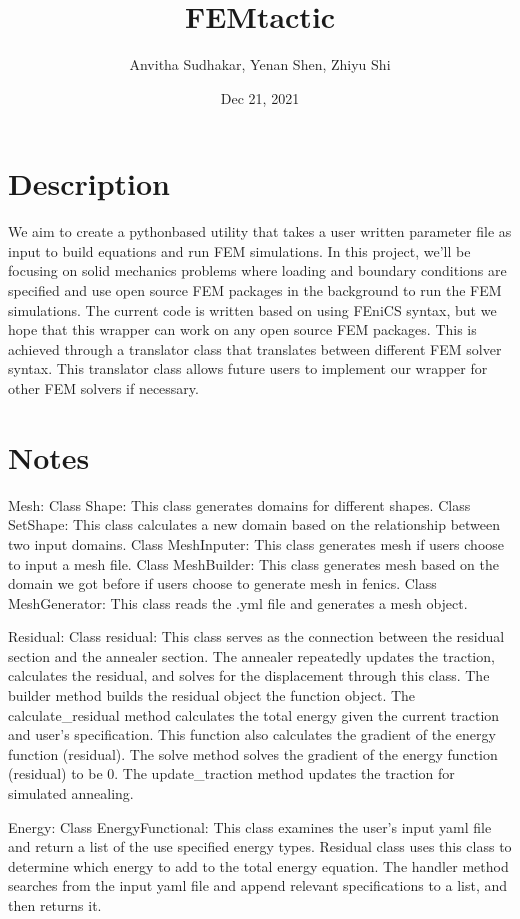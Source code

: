 \documentclass[letterpaper,10pt,english]{sphinxmanual}
\title{FEMtactic}
\date{Dec 21, 2021}
\author{Anvitha Sudhakar, Yenan Shen, Zhiyu Shi}
\begin{document}
\pagestyle{empty}
\sphinxmaketitle
\pagestyle{plain}
\sphinxtableofcontents
\pagestyle{normal}
\label{\detokenize{index::doc}}



\chapter{Description}
\label{\detokenize{index:description}}
We aim to create a python\sphinxhyphen{}based utility that takes a user written parameter file as input to build equations and run FEM simulations. In this project, we’ll be focusing on solid mechanics problems where loading and boundary conditions are specified and use open source FEM packages in the background to run the FEM simulations. The current code is written based on using FEniCS syntax, but we hope that this wrapper can work on any open source FEM packages. This is achieved through a translator class that translates between different FEM solver syntax. This translator class allows future users to implement our wrapper for other FEM solvers if necessary.


\chapter{Notes}
\label{\detokenize{index:notes}}
Mesh:
Class Shape: This class generates domains for different shapes.
Class SetShape: This class calculates a new domain based on the relationship between two input domains.
Class MeshInputer: This class generates mesh if users choose to input a mesh file.
Class MeshBuilder: This class generates mesh based on the domain we got before if users choose to generate mesh in fenics.
Class MeshGenerator: This class reads the .yml file and generates a mesh object.

Residual:
Class residual: This class serves as the connection between the residual section and the annealer section. The annealer repeatedly updates the traction, calculates the residual, and solves for the displacement through this class.
The builder method builds the residual object the function object.
The calculate\_residual method calculates the total energy given the current traction and user’s specification. This function also calculates the gradient of the energy function (residual).
The solve method solves the gradient of the energy function (residual) to be 0.
The update\_traction method updates the traction for simulated annealing.

Energy:
Class EnergyFunctional: This class examines the user’s input yaml file and return a list of the use specified energy types. Residual class uses this class to determine which energy to add to the total energy equation.
The handler method searches from the input yaml file and append relevant specifications to a list, and then returns it.
\end{document}
